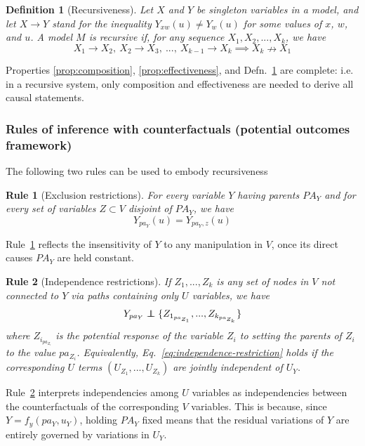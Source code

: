 \documentclass[11pt]{article}
\numberwithin{equation}{section}
\newcommand\indep{\protect\mathpalette{\protect\independenT}{\perp}}
\def\independenT#1#2{\mathrel{\rlap{$#1#2$}\mkern2mu{#1#2}}}
\newtheorem{defn}{Definition}[section]
\newtheorem{rle}{Rule}[section]
\begin{document}
\begin{defn}[Recursiveness] \label{def:recursiveness}
Let $X$ and $Y$ be singleton variables in a model, and let $X \rightarrow Y$ stand for the inequality $Y_{xw}(u) \neq Y_w(u)$ for some values of $x$, $w$, and $u$. A model $M$ is recursive if, for any sequence $X_1, X_2, ..., X_k$, we have
\begin{equation}
X_1 \rightarrow X_2,\ X_2 \rightarrow X_3,\ ...,\ X_{k-1} \rightarrow X_k \implies X_k \nrightarrow X_1
\end{equation}
\end{defn}

Properties \ref{prop:composition}, \ref{prop:effectiveness}, and Defn.~\ref{def:recursiveness} are complete: i.e. in a recursive system, only composition and effectiveness are needed to derive all causal statements.


\subsubsection{Rules of inference with counterfactuals (potential outcomes framework)}

The following two rules can be used to embody recursiveness
\begin{rle}[Exclusion restrictions] \label{rle:exclusion-restriction}
For every variable $Y$ having parents $PA_Y$ and for every set of variables $Z \subset V$ disjoint of $PA_Y$, we have
\begin{equation}
Y_{pa_Y}(u) = Y_{pa_Y, z}(u)
\end{equation}
\end{rle} 
Rule~\ref{rle:exclusion-restriction} reflects the insensitivity of $Y$ to any manipulation in $V$, once its direct causes $PA_Y$ are held constant.

\begin{rle}[Independence restrictions]\label{rle:independence-restriction}
If $Z_1, ..., Z_k$ is any set of nodes in $V$ not connected to $Y$ via paths containing only $U$ variables, we have
\begin{equation}
Y_{pa_Y} \indep \{Z_{1_{pa_{Z_1}}}, ..., Z_{k_{pa_{Z_k}}}\} \label{eq:independence-restriction}
\end{equation}
where $Z_{i_{pa_{Z_i}}}$ is the potential response of the variable $Z_i$ to setting the parents of $Z_i$ to the value $pa_{Z_i}$. Equivalently, Eq.~\ref{eq:independence-restriction} holds if the corresponding $U$ terms $(U_{Z_1}, ..., U_{Z_k})$ are jointly independent of $U_Y$.
\end{rle}
Rule~\ref{rle:independence-restriction} interprets independencies among $U$ variables as independencies between the counterfactuals of the corresponding $V$ variables. This is because, since $Y=f_y(pa_Y, u_Y)$, holding $PA_Y$ fixed means that the residual variations of $Y$ are entirely governed by variations in $U_Y$.
\end{document}
